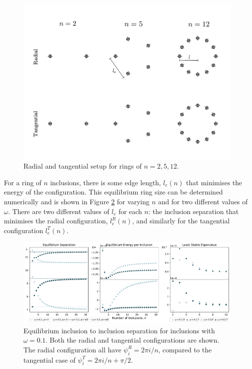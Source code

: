 \begin{figure}[h!]
\centering
\includegraphics[width=14cm]{elastic_figs/n_rings.pdf}
\caption{Radial and tangential setup for rings of $n=2,5,12$.}
\label{fig:polys2ring}
\end{figure}

For a ring of $n$ inclusions, there is some edge length, $l_e(n)$ that minimises the energy of the configuration. This equilibrium ring size can be determined numerically and is shown in Figure \ref{fig:Efnl} for varying $n$ and for two different values of $\omega$. There are two different values of $l_e$ for each $n$: the inclusion separation that minimises the radial configuration, $l_e^R(n)$, and similarly for the tangential configuration $l_e^T(n)$.

\begin{figure}[h]
\centering
\includegraphics[width=15cm]{elastic_figs/polys_multiple_w.pdf}
\caption{Equilibrium inclusion to inclusion separation for inclusions with $\omega=0.1$. Both the radial and tangential configurations are shown. The radial configuration all have $\psi^R_i=2\pi i/n$, compared to the tangential case of $\psi^T_i=2\pi i/n+\pi/2$. }
\label{fig:Efnl}
\end{figure}

